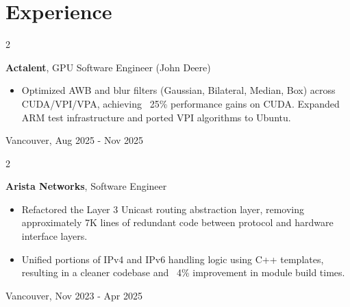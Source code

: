 \documentclass[10pt, letterpaper]{article}
\newenvironment{highlights}{
    \begin{itemize}[
        topsep=0.10 cm,
        parsep=0.10 cm,
        partopsep=0pt,
        itemsep=0pt,
        leftmargin=0.4 cm + 10pt
    ]
}{
    \end{itemize}
} %
\newenvironment{twocolentry}[2][]{
    \onecolentry
    \def\secondColumn{#2}
    \setcolumnwidth{\fill, 3.0 cm}
    \begin{paracol}{2}
}{
    \switchcolumn \raggedleft \secondColumn
    \end{paracol}
    \endonecolentry
} %
\begin{document}
    \section{Experience}
        \begin{twocolentry}{
            Vancouver, Aug 2025 - Nov 2025
        }
        \textbf{Actalent}, GPU Software Engineer (John Deere)
          \begin{highlights}
              \item Optimized AWB and blur filters (Gaussian, Bilateral, Median, Box) across CUDA/VPI/VPA, achieving ~25\% performance gains on CUDA. Expanded ARM test infrastructure and ported VPI algorithms to Ubuntu.
          \end{highlights}
        \end{twocolentry}

        \begin{twocolentry}{
            Vancouver, Nov 2023 - Apr 2025
        }

        \vspace{0.2 cm}
        \textbf{Arista Networks}, Software Engineer \begin{highlights}
                \item Refactored the Layer 3 Unicast routing abstraction layer, removing approximately 7K lines of redundant code between protocol and hardware interface layers.
                \item Unified portions of IPv4 and IPv6 handling logic using C++ templates, resulting in a cleaner codebase and ~4\% improvement in module build times.
            \end{highlights}
        \end{twocolentry}
\end{document}
